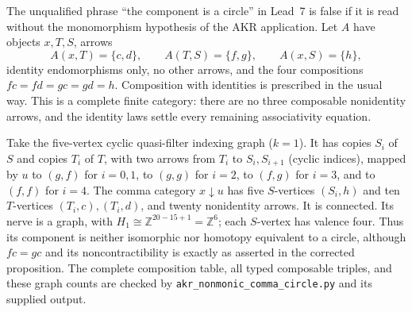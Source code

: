 \begin{example}\label{C:nonmonic-circle-counterexample}
The unqualified phrase ``the component is a circle'' in Lead~7 is
false if it is read without the monomorphism hypothesis of the AKR
application. Let $A$ have objects $x,T,S$, arrows
\[
 A(x,T)=\{c,d\},\qquad A(T,S)=\{f,g\},\qquad A(x,S)=\{h\},
\]
identity endomorphisms only, no other arrows, and the four compositions
$fc=fd=gc=gd=h$. Composition with identities is prescribed in the
usual way. This is a complete finite category: there are no three
composable nonidentity arrows, and the identity laws settle every
remaining associativity equation.

Take the five-vertex cyclic quasi-filter indexing graph ($k=1$).
It has copies $S_i$ of $S$ and copies $T_i$ of $T$, with two arrows
from $T_i$ to $S_i,S_{i+1}$ (cyclic indices), mapped by $u$ to
$(g,f)$ for $i=0,1$, to $(g,g)$ for $i=2$, to $(f,g)$ for $i=3$,
and to $(f,f)$ for $i=4$. The comma category $x\downarrow u$ has
five $S$-vertices $(S_i,h)$ and ten $T$-vertices
$(T_i,c),(T_i,d)$, and twenty nonidentity arrows. It is connected.
Its nerve is a graph, with $H_1\cong\mathbb Z^{20-15+1}
=\mathbb Z^6$; each $S$-vertex has valence four. Thus its component
is neither isomorphic nor homotopy equivalent to a circle, although
$fc=gc$ and its noncontractibility is exactly as asserted in the
corrected proposition. The complete composition table, all typed
composable triples, and these graph counts are checked by
\texttt{akr\_nonmonic\_comma\_circle.py} and its supplied output.
\end{example}

